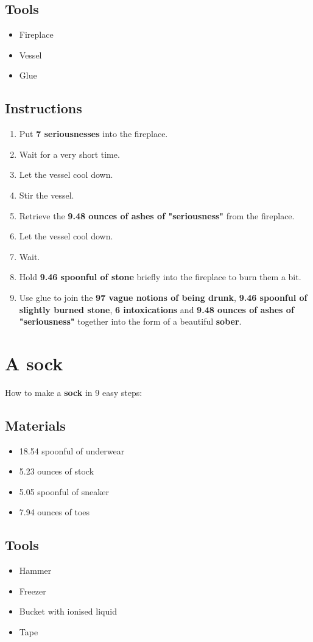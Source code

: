 \documentclass{article}
\begin{document}
\subsection{Tools}\begin{itemize}
\item 
Fireplace
\item 
Vessel
\item 
Glue
\end{itemize}
\subsection{Instructions}\begin{enumerate}
\item 
Put \textbf{7 seriousnesses} into the fireplace.
\item 
Wait for a very short time.
\item 
Let the vessel cool down.
\item 
Stir the vessel.
\item 
Retrieve the \textbf{9.48 ounces of ashes of "seriousness"} from the fireplace.
\item 
Let the vessel cool down.
\item 
Wait.
\item 
Hold \textbf{9.46 spoonful of stone} briefly into the fireplace to burn them a bit.
\item 
Use glue to join the \textbf{97 vague notions of being drunk}, \textbf{9.46 spoonful of slightly burned stone}, \textbf{6 intoxications} and \textbf{9.48 ounces of ashes of "seriousness"} together into the form of a beautiful \textbf{sober}.
\end{enumerate}
\newpage
\section{A sock}How to make a \textbf{sock} in 9 easy steps:

\subsection{Materials}\begin{itemize}
\item 
18.54 spoonful of underwear
\item 
5.23 ounces of stock
\item 
5.05 spoonful of sneaker
\item 
7.94 ounces of toes
\end{itemize}
\subsection{Tools}\begin{itemize}
\item 
Hammer
\item 
Freezer
\item 
Bucket with ionised liquid
\item 
Tape
\end{itemize}
\end{document}
